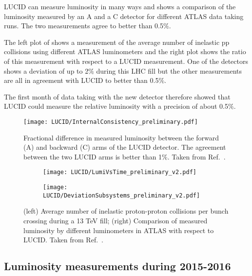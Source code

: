 LUCID can measure luminosity in many ways and  shows a comparison of the 
luminosity measured by an A and 
a C detector for different ATLAS data taking runs. The two measurements agree to better than 0.5$\%$.

The left plot of  shows a measurement of the average number of inelastic pp collisions 
using different ATLAS 
luminometers and the right plot shows the ratio of this measurement with respect to a LUCID measurement. One of the 
detectors shows a deviation of up to 2$\%$ during this LHC fill but the other measurements are all in agreement 
with LUCID to better than 0.5$\%$.

The first month of data taking with the new detector therefore showed that LUCID could measure the relative 
luminosity with a precision of about 0.5$\%$.

\begin{figure}
\centering
\texttt{[image: LUCID/InternalConsistency\_preliminary.pdf]}
\caption{Fractional difference in measured luminosity between the forward (A) and backward (C) arms of the LUCID 
detector. The agreement between the two LUCID arms is better than 1$\%$. Taken from Ref.~\cite{publicPlots}.}
\label{fig:InternalConsistency}
\end{figure}


\begin{figure}
\centering
\begin{subfigure}{.5\textwidth}
  \centering
  \texttt{[image: LUCID/LumiVsTime\_preliminary\_v2.pdf]}
  \label{fig:sub3}
\end{subfigure}%
\begin{subfigure}{.5\textwidth}
  \centering
  \texttt{[image: LUCID/DeviationSubsystems\_preliminary\_v2.pdf]}
  \label{fig:sub4}
\end{subfigure}
\caption{(left) Average number of inelastic proton-proton collisions per bunch crossing during a 13 TeV fill; 
(right) Comparison of measured luminosity by different luminometers in ATLAS with respect to LUCID. Taken from Ref.~\cite{publicPlots}.}
\label{fig:LumiVsTime}
\end{figure}


\subsection{Luminosity measurements during 2015-2016}



